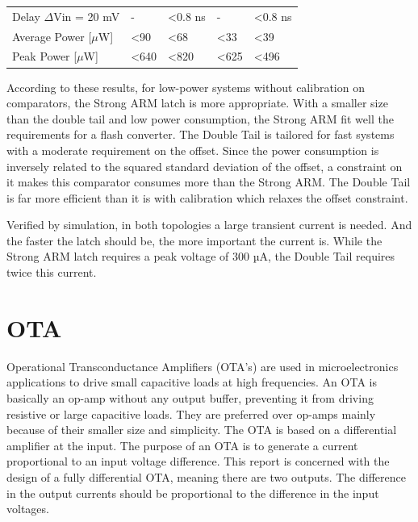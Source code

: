 \begin{table}[ht]
\begin{tabular}{@{}lllll@{}}
    Delay \(\Delta\)Vin = 20 mV                                                                                   & -                            & \textless 0.8 ns              & -                           & \textless 0.8 ns              \\
    Average Power {[}\(\mu\)W{]}                                                                               & \textless 90                 & \textless 68                  & \textless 33                & \textless 39                  \\
    Peak Power {[}\(\mu\)W{]}                                                                                  & \textless 640                & \textless 820                 & \textless 625               & \textless 496                 \\ \bottomrule
    \end{tabular}
    \end{table}

According to these results, for low-power systems without calibration on comparators, the Strong ARM latch is more appropriate. With a smaller size than the double tail and low power consumption, the Strong ARM fit well the requirements for a flash converter.
The Double Tail is tailored for fast systems with a moderate requirement on the offset. Since the power consumption is inversely related to the squared standard deviation of the offset, a constraint on it makes this comparator consumes more than the Strong ARM\@. The Double Tail is far more efficient than it is with calibration which relaxes the offset constraint.

Verified by simulation, in both topologies a large transient current is needed. And the faster the latch should be, the more important the current is. While the Strong ARM latch requires a peak voltage of 300 µA, the Double Tail requires twice this current.

\section{OTA}                              %
Operational Transconductance Amplifiers (OTA’s) are used in microelectronics applications to drive small capacitive loads at high frequencies. An OTA is basically an op-amp without any output buffer, preventing it from driving resistive or large capacitive loads. They are preferred over op-amps mainly because of their smaller size and simplicity. The OTA is based on a differential amplifier at the input. The purpose of an OTA is to generate a current proportional to an input voltage difference. This report is concerned with the design of a fully differential OTA, meaning there are two outputs. The difference in the output currents should be proportional to the difference in the input voltages.
